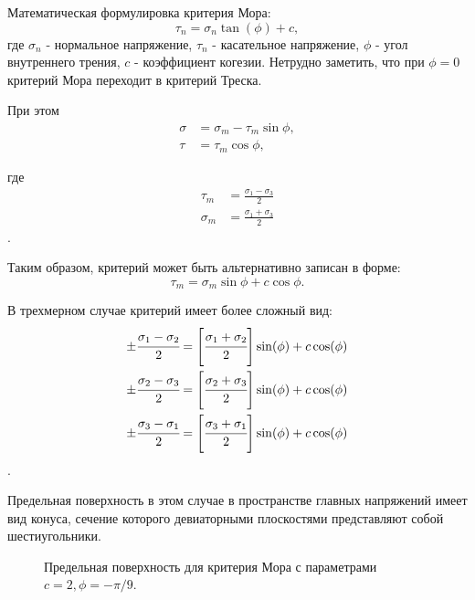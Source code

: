 Математическая формулировка критерия Мора:
\begin{equation}
\label{mohr_criteria}
\tau_n = \sigma_n\tan(\phi) + c,
\end{equation}
где $\sigma_n$ - нормальное напряжение, $\tau_n$ - касательное напряжение, $\phi$ - угол внутреннего трения, $c$ - коэффициент когезии. Нетрудно заметить, что при $\phi = 0$ критерий Мора переходит в критерий Треска.

При этом
\begin{align}
\sigma &= \sigma_m - \tau_m \sin\phi, \nonumber\\
\tau &= \tau_m \cos\phi,
\end{align}

где
\begin{align}
\tau_m &= \frac{\sigma_1-\sigma_3}{2} \nonumber\\
\sigma_m &= \frac{\sigma_1+\sigma_3}{2} 
\end{align}.

Таким образом, критерий может быть альтернативно записан в форме:
\begin{equation}
\tau_m = \sigma_m \sin\phi + c \cos\phi.
\end{equation}

В трехмерном случае критерий имеет более сложный вид:
\begin{align}
  \pm\cfrac{\sigma_1 - \sigma_2}{2} & = \left[\cfrac{\sigma_1 + \sigma_2}{2}\right]\sin(\phi) + c\cos(\phi) \nonumber\\
  \pm\cfrac{\sigma_2 - \sigma_3}{2} & = \left[\cfrac{\sigma_2 + \sigma_3}{2}\right]\sin(\phi) + c\cos(\phi) \nonumber\\
  \pm\cfrac{\sigma_3 - \sigma_1}{2} & = \left[\cfrac{\sigma_3 + \sigma_1}{2}\right]\sin(\phi) + c\cos(\phi)
\end{align}.

Предельная поверхность в этом случае в пространстве главных напряжений имеет вид конуса, сечение которого девиаторными плоскостями представляют собой шестиугольники.

\begin{figure}[h]
\caption{Предельная поверхность для критерия Мора с параметрами $c = 2, \phi = -\pi/9$.}
\end{figure}

